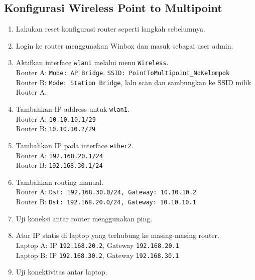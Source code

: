 \subsection{Konfigurasi Wireless Point to Multipoint}
\begin{enumerate}
    \item Lakukan reset konfigurasi router seperti langkah sebelumnya.
    
    \item Login ke router menggunakan Winbox dan masuk sebagai user admin.
    
    \item Aktifkan interface \texttt{wlan1} melalui menu \texttt{Wireless}. \\
    Router A: \texttt{Mode: AP Bridge}, \texttt{SSID: PointToMultipoint\_NoKelompok} \\
    Router B: \texttt{Mode: Station Bridge}, lalu scan dan sambungkan ke SSID milik Router A.
    
    \item Tambahkan IP address untuk \texttt{wlan1}. \\
    Router A: \texttt{10.10.10.1/29} \\
    Router B: \texttt{10.10.10.2/29}

    \item Tambahkan IP pada interface \texttt{ether2}. \\
    Router A: \texttt{192.168.20.1/24} \\
    Router B: \texttt{192.168.30.1/24}

    \item Tambahkan routing manual. \\
    Router A: \texttt{Dst: 192.168.30.0/24, Gateway: 10.10.10.2} \\
    Router B: \texttt{Dst: 192.168.20.0/24, Gateway: 10.10.10.1}

    \item Uji koneksi antar router menggunakan ping.

    \item Atur IP statis di laptop yang terhubung ke masing-masing router. \\
    Laptop A: IP \texttt{192.168.20.2}, Gateway \texttt{192.168.20.1} \\
    Laptop B: IP \texttt{192.168.30.2}, Gateway \texttt{192.168.30.1}

    \item Uji konektivitas antar laptop.
\end{enumerate}

